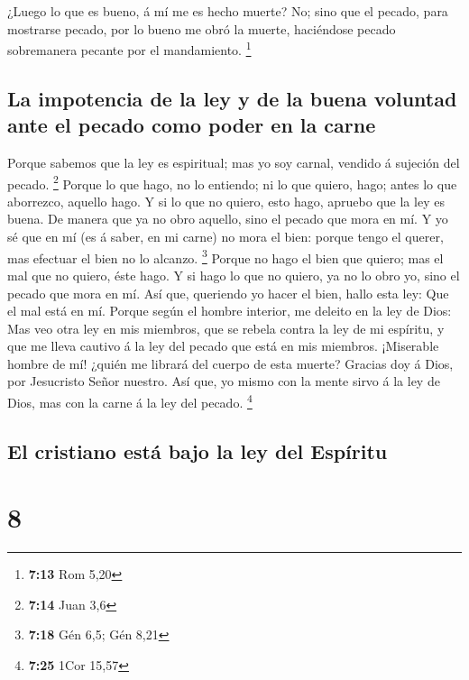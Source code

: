  ¿Luego lo que es bueno, á mí me es hecho muerte? No;
sino que el pecado, para mostrarse pecado, por lo bueno me obró la
muerte, haciéndose pecado sobremanera pecante por el mandamiento.
\footnote{\textbf{7:13} Rom 5,20}

\hypertarget{la-impotencia-de-la-ley-y-de-la-buena-voluntad-ante-el-pecado-como-poder-en-la-carne}{%
\subsection{La impotencia de la ley y de la buena voluntad ante el
pecado como poder en la
carne}\label{la-impotencia-de-la-ley-y-de-la-buena-voluntad-ante-el-pecado-como-poder-en-la-carne}}

 Porque sabemos que la ley es espiritual; mas yo soy
carnal, vendido á sujeción del pecado. \footnote{\textbf{7:14} Juan 3,6}
 Porque lo que hago, no lo entiendo; ni lo que quiero,
hago; antes lo que aborrezco, aquello hago.  Y si lo que
no quiero, esto hago, apruebo que la ley es buena.  De
manera que ya no obro aquello, sino el pecado que mora en mí.
 Y yo sé que en mí (es á saber, en mi carne) no mora el
bien: porque tengo el querer, mas efectuar el bien no lo alcanzo.
\footnote{\textbf{7:18} Gén 6,5; Gén 8,21}  Porque no
hago el bien que quiero; mas el mal que no quiero, éste hago.
 Y si hago lo que no quiero, ya no lo obro yo, sino el
pecado que mora en mí.  Así que, queriendo yo hacer el
bien, hallo esta ley: Que el mal está en mí.  Porque
según el hombre interior, me deleito en la ley de Dios: 
Mas veo otra ley en mis miembros, que se rebela contra la ley de mi
espíritu, y que me lleva cautivo á la ley del pecado que está en mis
miembros.  ¡Miserable hombre de mí! ¿quién me librará del
cuerpo de esta muerte?  Gracias doy á Dios, por
Jesucristo Señor nuestro. Así que, yo mismo con la mente sirvo á la ley
de Dios, mas con la carne á la ley del pecado. \footnote{\textbf{7:25}
  1Cor 15,57}

\hypertarget{el-cristiano-estuxe1-bajo-la-ley-del-espuxedritu}{%
\subsection{El cristiano está bajo la ley del
Espíritu}\label{el-cristiano-estuxe1-bajo-la-ley-del-espuxedritu}}

\hypertarget{section-7}{%
\section{8}\label{section-7}}

